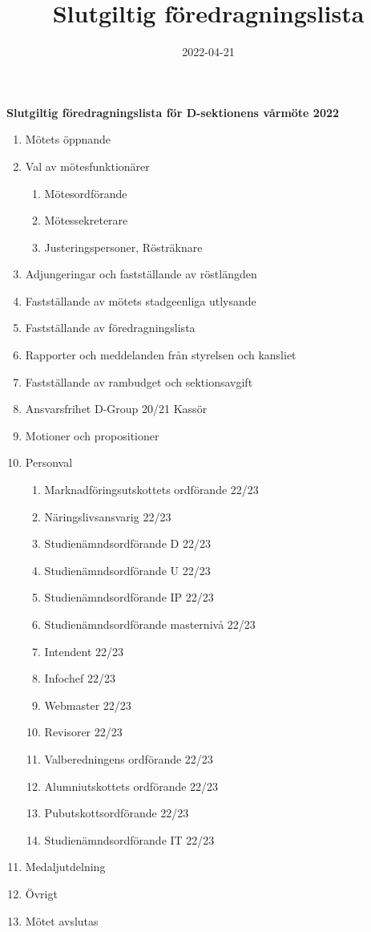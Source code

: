 \documentclass{datateknologsektionen-document}
\title{Slutgiltig föredragningslista}
\date{2022-04-21}
\begin{document}
\large
\begin{center}
  {\LARGE\bfseries Slutgiltig föredragningslista för D-sektionens vårmöte 2022}
  \vspace{2mm}
\end{center}

\Large
\begin{enumerate}[topsep=0pt,itemsep=1ex]
  \item Mötets öppnande
  \item Val av mötesfunktionärer
        \begin{enumerate}[label*=\arabic*.,leftmargin=3em]
          \item Mötesordförande
          \item Mötessekreterare
          \item Justeringspersoner, Rösträknare
        \end{enumerate}
  \item Adjungeringar och fastställande av röstlängden
  \item Fastställande av mötets stadgeenliga utlysande
  \item Fastställande av föredragningslista
  \item Rapporter och meddelanden från styrelsen och kansliet
  \item Fastställande av rambudget och sektionsavgift
  \item Ansvarsfrihet D-Group 20/21 Kassör
  \item Motioner och propositioner
  \item Personval
        \begin{enumerate}[label*=\arabic*.,leftmargin=3em]
          \item Marknadföringsutskottets ordförande 22/23
          \item Näringslivsansvarig 22/23
          \item Studienämndsordförande D 22/23
          \item Studienämndsordförande U 22/23
          \item Studienämndsordförande IP 22/23
          \item Studienämndsordförande masternivå 22/23
          \item Intendent 22/23
          \item Infochef 22/23
          \item Webmaster 22/23
          \item Revisorer 22/23
          \item Valberedningens ordförande 22/23
          \item Alumniutskottets ordförande 22/23
          \item Pubutskottsordförande 22/23
          \item Studienämndsordförande IT 22/23
        \end{enumerate}
  \item Medaljutdelning
  \item Övrigt
  \item Mötet avslutas
\end{enumerate}
\end{document}
